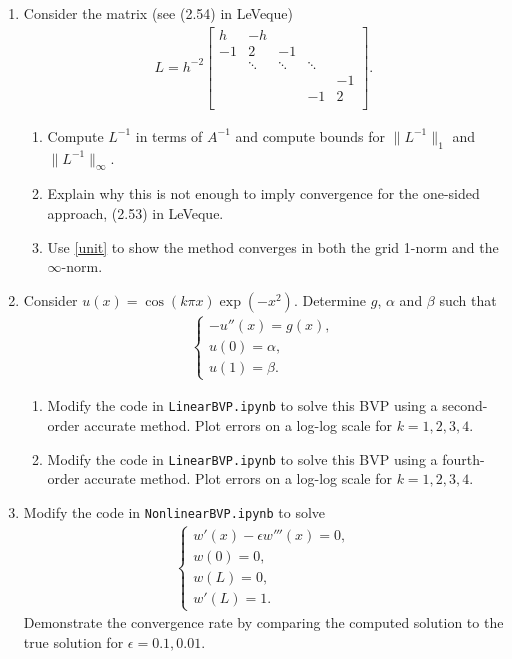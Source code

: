 \documentclass[10pt]{amsart}
\begin{document}
\begin{enumerate}[label={\bf Problem~{\arabic*}:}]
  \item Consider the matrix (see (2.54) in LeVeque)
    \begin{align*}
      L = h^{-2} \begin{bmatrix} h & -h \\ -1 & 2 &-1 \\  
    & \ddots & \ddots & \ddots \\
    &&&& -1\\
    &&&-1& 2\\
  \end{bmatrix}.\end{align*}
\begin{enumerate}
  \item Compute $L^{-1}$ in terms of $A^{-1}$ and compute bounds for  $\|L^{-1}\|_1$ and $\|L^{-1}\|_\infty$.
  \item Explain why this is not enough to imply convergence for the one-sided approach, (2.53) in LeVeque.
    \item Use \eqref{unit} to show the method converges in both the grid 1-norm and the $\infty$-norm.
  \end{enumerate}
\mline

\item Consider $u(x) = \cos(k \pi x) \exp(-x^2)$.  Determine $g$, $\alpha$ and $\beta$ such that
  \begin{align*}
    \begin{cases} -u''(x) = g(x),\\
      u(0) = \alpha,\\
      u(1) = \beta. \end{cases}
  \end{align*}
  \begin{enumerate}
  \item Modify the code in {\tt LinearBVP.ipynb} to solve this BVP using a second-order accurate method.  Plot errors on a log-log scale for $k = 1,2,3,4$.
   \item Modify the code in {\tt LinearBVP.ipynb} to solve this BVP using a fourth-order accurate method.  Plot errors on a log-log scale for $k = 1,2,3,4$. 
  \end{enumerate}
  \mline

\item Modify the code in {\tt NonlinearBVP.ipynb} to solve
  \begin{align*}
 \begin{cases}
 w'(x) - \epsilon w'''(x) = 0,\\
 w(0) = 0,\\
 w(L) = 0,\\
 w'(L) = 1.
 \end{cases}
  \end{align*}
 Demonstrate the convergence rate by comparing the computed solution
 to the true solution for $\epsilon = 0.1, 0.01$.
  
  \end{enumerate}
\end{document}
